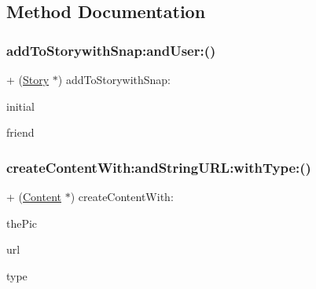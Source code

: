 \subsection{Method Documentation}
\hypertarget{interface_snap_create_a47a5a18c5a8aff573bb35f3f3513a039}{}\label{interface_snap_create_a47a5a18c5a8aff573bb35f3f3513a039} 
\subsubsection{\texorpdfstring{add\+To\+Storywith\+Snap\+:and\+User\+:()}{addToStorywithSnap:andUser:()}}
{\footnotesize\ttfamily + (\hyperlink{interface_story}{Story} $\ast$) add\+To\+Storywith\+Snap\+: \begin{DoxyParamCaption}\item[{(nonnull \hyperlink{interface_snap}{Snap} $\ast$)}]{initial }\item[{andUser:(nonnull \hyperlink{interface_friend}{Friend} $\ast$)}]{friend }\end{DoxyParamCaption}}

\hypertarget{interface_snap_create_a5d32474fa42fb8880d049bdbeb643653}{}\label{interface_snap_create_a5d32474fa42fb8880d049bdbeb643653} 
\subsubsection{\texorpdfstring{create\+Content\+With\+:and\+String\+U\+R\+L\+:with\+Type\+:()}{createContentWith:andStringURL:withType:()}}
{\footnotesize\ttfamily + (\hyperlink{interface_content}{Content} $\ast$) create\+Content\+With\+: \begin{DoxyParamCaption}\item[{(U\+I\+Image $\ast$)}]{the\+Pic }\item[{andStringURL:(N\+S\+String $\ast$)}]{url }\item[{withType:(int)}]{type }\end{DoxyParamCaption}}

\hypertarget{interface_snap_create_aa922b646f4928ffab8f9287781aeac2c}{}\label{interface_snap_create_aa922b646f4928ffab8f9287781aeac2c} 
